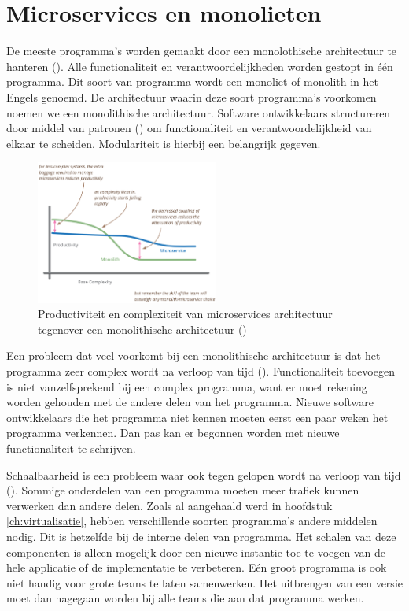 \chapter{Microservices en monolieten}
\label{ch:microservices}

De meeste programma's worden gemaakt door een monolothische architectuur te hanteren (\cite{villamizar_evaluating_2015}). Alle functionaliteit en verantwoordelijkheden worden gestopt in één programma. Dit soort van programma wordt een monoliet of monolith in het Engels genoemd. De architectuur waarin deze soort programma's voorkomen noemen we een monolithische architectuur. Software ontwikkelaars structureren door middel van patronen (\cite{tichy_catalogue_1997}) om functionaliteit en verantwoordelijkheid van elkaar te scheiden. Modulariteit is hierbij een belangrijk gegeven.

\begin{figure}
    \centering
    \includegraphics[width=6cm]{img/microservices_monolith}
    \caption{Productiviteit en complexiteit van microservices architectuur tegenover een monolithische architectuur (\cite{martin_fowler_microservicepremium_2015})}
    \label{fig:pr}
\end{figure}

Een probleem dat veel voorkomt bij een monolithische architectuur is dat het programma zeer complex wordt na verloop van tijd (\cite{villamizar_evaluating_2015}). Functionaliteit toevoegen is niet vanzelfsprekend bij een complex programma, want er moet rekening worden gehouden met de andere delen van het programma. Nieuwe software ontwikkelaars die het programma niet kennen moeten eerst een paar weken het programma verkennen. Dan pas kan er begonnen worden met nieuwe functionaliteit te schrijven.

Schaalbaarheid is een probleem waar ook tegen gelopen wordt na verloop van tijd (\cite{villamizar_evaluating_2015}). Sommige onderdelen van een programma moeten meer trafiek kunnen verwerken dan andere delen. Zoals al aangehaald werd in hoofdstuk \ref{ch:virtualisatie}, hebben verschillende soorten programma's andere middelen nodig. Dit is hetzelfde bij de interne delen van programma. Het schalen van deze componenten is alleen mogelijk door een nieuwe instantie toe te voegen van de hele applicatie of de implementatie te verbeteren. Eén groot programma is ook niet handig voor grote teams te laten samenwerken. Het uitbrengen van een versie moet dan nagegaan worden bij alle teams die aan dat programma werken.

